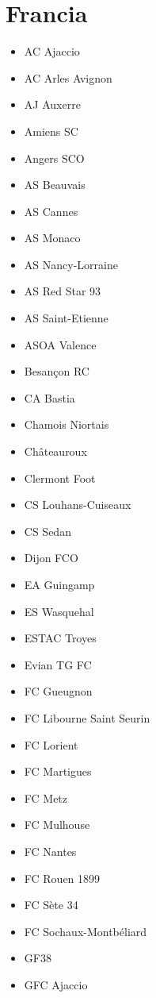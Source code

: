 \section{Francia}\label{sec:equipos-fra}
\begin{multicols}{2}
	\begin{itemize}
	    \setlength{\itemsep}{1pt}
	    \setlength{\parskip}{0pt}
	    \setlength{\parsep}{0pt}
		\item AC Ajaccio
		\item AC Arles Avignon
		\item AJ Auxerre
		\item Amiens SC
		\item Angers SCO
		\item AS Beauvais
		\item AS Cannes
		\item AS Monaco
		\item AS Nancy-Lorraine
		\item AS Red Star 93
		\item AS Saint-Etienne
		\item ASOA Valence
		\item Besançon RC
		\item CA Bastia
		\item Chamois Niortais
		\item Châteauroux
		\item Clermont Foot
		\item CS Louhans-Cuiseaux
		\item CS Sedan
		\item Dijon FCO
		\item EA Guingamp
		\item ES Wasquehal
		\item ESTAC Troyes
		\item Evian TG FC
		\item FC Gueugnon
		\item FC Libourne Saint Seurin
		\item FC Lorient
		\item FC Martigues
		\item FC Metz
		\item FC Mulhouse
		\item FC Nantes
		\item FC Rouen 1899
		\item FC Sète 34
		\item FC Sochaux-Montbéliard
		\item GF38
		\item GFC Ajaccio

\end{itemize}
\end{multicols}
